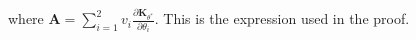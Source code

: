 where $\mathbf{A} = \sum_{i=1}^2 v_i \frac{\partial \mathbf{K}_{\theta^*}}{\partial \theta_i}$. This is the expression used in the proof.





